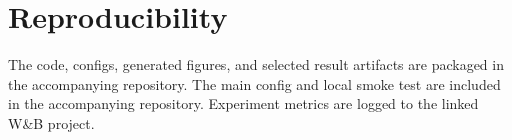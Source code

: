 \documentclass[11pt]{article}
\begin{document}
\section{Reproducibility}
The code, configs, generated figures, and selected result artifacts are packaged in the accompanying repository.
The main config and local smoke test are included in the accompanying repository.
Experiment metrics are logged to the linked W\&B project.



\end{document}
